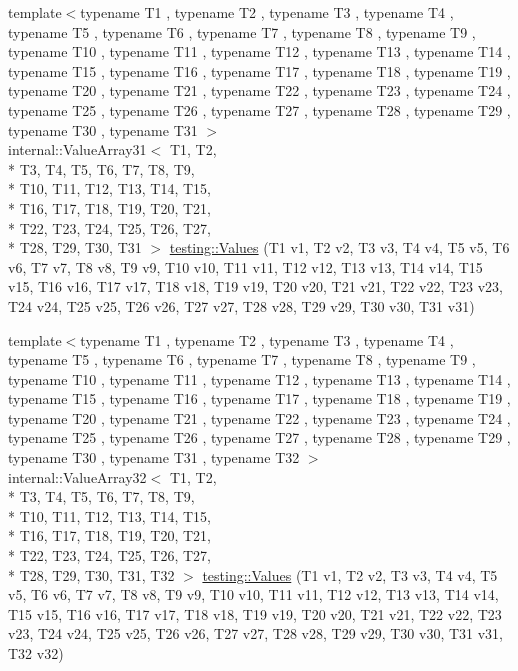 \begin{DoxyCompactItemize}
\item 
{\footnotesize template$<$typename T1 , typename T2 , typename T3 , typename T4 , typename T5 , typename T6 , typename T7 , typename T8 , typename T9 , typename T10 , typename T11 , typename T12 , typename T13 , typename T14 , typename T15 , typename T16 , typename T17 , typename T18 , typename T19 , typename T20 , typename T21 , typename T22 , typename T23 , typename T24 , typename T25 , typename T26 , typename T27 , typename T28 , typename T29 , typename T30 , typename T31 $>$ }\\internal\-::\-Value\-Array31$<$ T1, T2, \\*
T3, T4, T5, T6, T7, T8, T9, \\*
T10, T11, T12, T13, T14, T15, \\*
T16, T17, T18, T19, T20, T21, \\*
T22, T23, T24, T25, T26, T27, \\*
T28, T29, T30, T31 $>$ \hyperlink{namespacetesting_a40d9696e1754455c8329a866c17ed7bb}{testing\-::\-Values} (T1 v1, T2 v2, T3 v3, T4 v4, T5 v5, T6 v6, T7 v7, T8 v8, T9 v9, T10 v10, T11 v11, T12 v12, T13 v13, T14 v14, T15 v15, T16 v16, T17 v17, T18 v18, T19 v19, T20 v20, T21 v21, T22 v22, T23 v23, T24 v24, T25 v25, T26 v26, T27 v27, T28 v28, T29 v29, T30 v30, T31 v31)
\item 
{\footnotesize template$<$typename T1 , typename T2 , typename T3 , typename T4 , typename T5 , typename T6 , typename T7 , typename T8 , typename T9 , typename T10 , typename T11 , typename T12 , typename T13 , typename T14 , typename T15 , typename T16 , typename T17 , typename T18 , typename T19 , typename T20 , typename T21 , typename T22 , typename T23 , typename T24 , typename T25 , typename T26 , typename T27 , typename T28 , typename T29 , typename T30 , typename T31 , typename T32 $>$ }\\internal\-::\-Value\-Array32$<$ T1, T2, \\*
T3, T4, T5, T6, T7, T8, T9, \\*
T10, T11, T12, T13, T14, T15, \\*
T16, T17, T18, T19, T20, T21, \\*
T22, T23, T24, T25, T26, T27, \\*
T28, T29, T30, T31, T32 $>$ \hyperlink{namespacetesting_afeff614d4c808c753bbfa208409ad664}{testing\-::\-Values} (T1 v1, T2 v2, T3 v3, T4 v4, T5 v5, T6 v6, T7 v7, T8 v8, T9 v9, T10 v10, T11 v11, T12 v12, T13 v13, T14 v14, T15 v15, T16 v16, T17 v17, T18 v18, T19 v19, T20 v20, T21 v21, T22 v22, T23 v23, T24 v24, T25 v25, T26 v26, T27 v27, T28 v28, T29 v29, T30 v30, T31 v31, T32 v32)

\end{DoxyCompactItemize}

